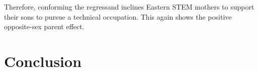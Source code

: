 \documentclass[a4paper, oneside, hyperfootnotes = false]{article}
\begin{document}
{Therefore, conforming the regressand inclines Eastern STEM mothers to support their sons to pursue a technical occupation.
This again shows the positive opposite-sex parent effect.

\section{Conclusion}
\label{conclusion}


\vspace{4cm}

{}

\makeatletter %


\label{references}

\makeatother

\vspace{-.3cm}

\clearpage

}
\end{document}

